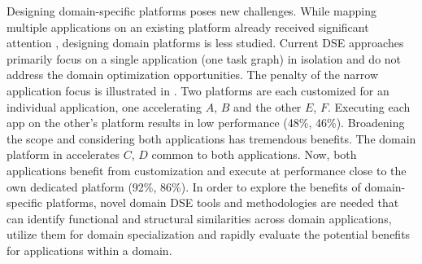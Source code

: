 
Designing domain-specific platforms poses new challenges. 
While mapping multiple applications on an existing platform already received significant attention   \cite{kuang2005partitioning,wu2006low,abdeen2014multi,tang2015hardware}, 
designing domain platforms is less studied. 
Current DSE approaches primarily focus on a single application (one task graph) in isolation and do not address the domain optimization opportunities. 
The penalty of the narrow application focus is illustrated in . Two platforms are each customized for an individual application, one accelerating $A$, $B$ and the other $E$, $F$. Executing each app on the other's platform results in low performance (48\%, 46\%).  Broadening the scope and considering both applications has tremendous benefits. The domain platform in  accelerates $C$, $D$ common to both applications. Now, both applications benefit from customization and execute at performance close to the own dedicated platform (92\%, 86\%). In order to explore the benefits of domain-specific platforms,  novel domain DSE tools and methodologies are needed that can identify functional and structural similarities across domain applications, utilize them for domain specialization and rapidly evaluate the potential benefits for applications within a domain.


